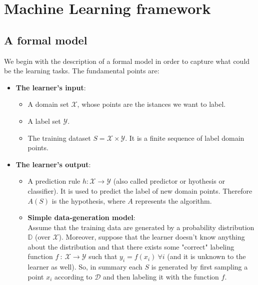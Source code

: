 \documentclass[../../main/main.tex]{subfiles}
\begin{document}
\chapter{Machine Learning framework}

\section{A formal model}
We begin with the description of a formal model in order to capture what could be the learning tasks. The fundamental points are:

\begin{itemize}
    \item \textbf{The learner's input}:
    \begin{itemize}
        \item A domain set \( \mathcal{X} \), whose points are the istances we want to label.
        \item A label set \( \mathcal{Y} \).
        \item The training dataset \( S = \mathcal{X} \times \mathcal{Y} \). It is a finite sequence of label domain points.
    \end{itemize}

    \item \textbf{The learner's output}:
    \begin{itemize}
        \item A prediction rule \( h: \mathcal{X} \to \mathcal{Y} \) (also called predictor or hyothesis or classifier). It is used to predict the label of new domain points. Therefore \( A(S) \) is the hypothesis, where \( A \) represents the algorithm.

        \item \textbf{Simple data-generation model}:\\
            Assume that the training data are generated by a probability distribution \( \mathbb{D} \) (over \( \mathcal{X} \)). Moreover, suppose that the learner doesn't know anything about the distribution and that there exists some "correct" labeling function \( f \ : \ \mathcal{X} \to \mathcal{Y} \) such that \( y_i = f(x_i) \ \forall i \) (and it is unknown to the learner as well). So, in summary each \( S \) is generated by first sampling a point \( x_i \) according to \( \mathcal{D} \) and then labeling it with the function \( f \).
    \end{itemize}


\end{itemize}
\end{document}
